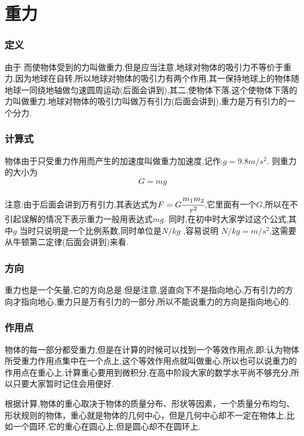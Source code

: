 \section{重力}
\subsubsection{定义}
由于 而使物体受到的力叫做重力.但是应当注意,地球对物体的吸引力不等价于重力,因为地球在自转,所以地球对物体的吸引力有两个作用,其一保持地球上的物体随地球一同绕地轴做匀速圆周运动(后面会讲到),其二,使物体下落.这个使物体下落的力叫做重力.地球对物体的吸引力叫做万有引力(后面会讲到),重力是万有引力的一个分力.

\subsubsection{计算式}
物体由于只受重力作用而产生的加速度叫做重力加速度,记作:$g=9.8m/s^2$.
则重力的大小为
$$G=mg$$

注意:由于后面会讲到万有引力,其表达式为$F=G\cfrac{m_1m_2}{r^2}$,它里面有一个$G$,所以在不引起误解的情况下表示重力一般用表达式$mg$. 同时,在初中时大家学过这个公式,其中$g$ 当时只说明是一个比例系数,同时单位是$N/kg$ ,容易说明 $N/kg=m/s^2$,这需要从牛顿第二定律(后面会讲到)来看.

\subsubsection{方向}
重力也是一个矢量,它的方向总是.但是注意,竖直向下不是指向地心,万有引力的方向才指向地心,重力只是万有引力的一部分,所以不能说重力的方向是指向地心的.

\subsubsection{作用点}

物体的每一部分都受重力,但是在计算的时候可以找到一个等效作用点,即:认为物体所受重力作用点集中在一个点上,这个等效作用点就叫做重心.所以也可以说重力的作用点在重心上.计算重心要用到微积分,在高中阶段大家的数学水平尚不够充分,所以只要大家暂时记住会用便好.

根据计算,物体的重心取决于物体的质量分布、形状等因素，一个质量分布均匀、形状规则的物体，重心就是物体的几何中心，但是几何中心却不一定在物体上,比如一个圆环,它的重心在圆心上,但是圆心却不在圆环上.

